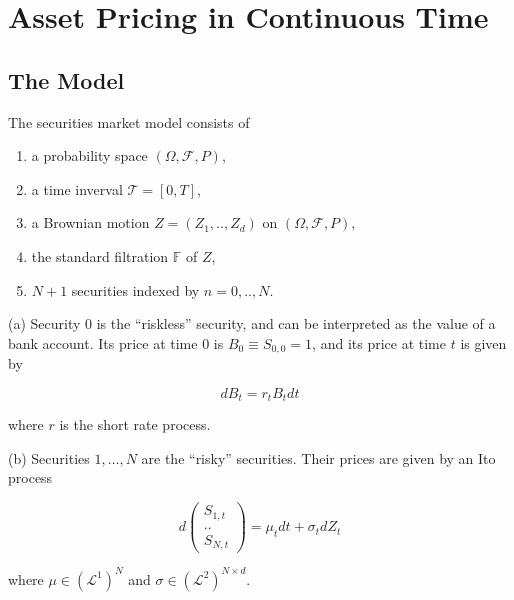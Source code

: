 \documentclass[\topdir/lecture\_notes.tex]{subfiles}
\begin{document}
\graphicspath{{images/}}


\section{Asset Pricing in Continuous Time}

\subsection{The Model}
The securities market model consists of

\begin{enumerate}
  \item a probability space $(\Omega, \mathcal{F}, P)$,

  \item a time inverval $\mathcal{T}=[0, T]$,

  \item a Brownian motion $Z=\left(Z_{1}, . ., Z_{d}\right)$ on $(\Omega, \mathcal{F}, P)$,

  \item the standard filtration $\mathbb{F}$ of $Z$,

  \item $N+1$ securities indexed by $n=0, . ., N$.

\end{enumerate}

(a) Security 0 is the ``riskless'' security, and can be interpreted as the value of a bank account. Its price at time 0 is $B_{0} \equiv S_{0,0}=1$, and its price at time $t$ is given by

\begin{equation*}
d B_{t}=r_{t} B_{t} d t
\end{equation*}

where $r$ is the short rate process.

(b) Securities $1, \ldots, N$ are the ``risky'' securities. Their prices are given by an Ito process

\begin{equation*}
d\left(\begin{array}{c}
S_{1, t} \\
. . \\
S_{N, t}
\end{array}\right)=\mu_{t} d t+\sigma_{t} d Z_{t}
\end{equation*}

where $\mu \in\left(\mathcal{L}^{1}\right)^{N}$ and $\sigma \in\left(\mathcal{L}^{2}\right)^{N \times d}$.
\end{document}
